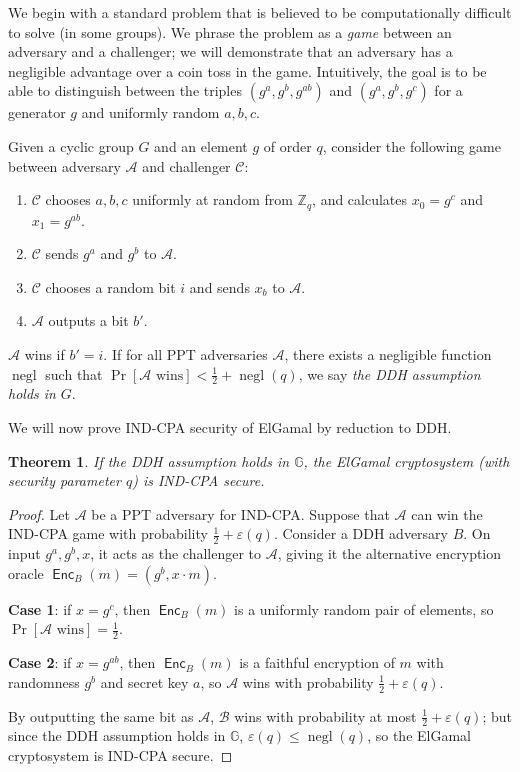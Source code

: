 \documentclass[11pt,twoside,a4paper]{article}
\DeclareMathOperator{\negl}{\text{negl}}
\DeclareMathOperator{\Enc}{\mathsf{Enc}}
\newtheorem{theorem}{Theorem}[section]
\theoremstyle{definition}
\begin{document}
We begin with a standard problem that is believed to be computationally difficult to solve (in some groups). We phrase the problem as a \textit{game} between an adversary and a challenger; we will demonstrate that an adversary has a negligible advantage over a coin toss in the game. Intuitively, the goal is to be able to distinguish between the triples $(g^a, g^b, g^{ab})$ and $(g^a, g^b, g^c)$ for  a generator $g$ and uniformly random $a, b, c$.

\begin{definition}
    Given a cyclic group $G$ and an element $g$ of order $q$, consider the following game between adversary $\mathcal{A}$ and challenger $\mathcal{C}$:
    \begin{enumerate}
        \item $\mathcal{C}$ chooses $a, b, c$ uniformly at random from $\mathbb{Z}_q$, and calculates $x_0=g^c$ and $x_1=g^{ab}$.
        \item $\mathcal{C}$ sends $g^a$ and $g^b$ to $\mathcal{A}$.
        \item $\mathcal{C}$ chooses a random bit $i$ and sends $x_b$ to $\mathcal{A}$.
        \item $\mathcal{A}$ outputs a bit $b'$.
    \end{enumerate}
    $\mathcal{A}$ wins if $b' = i$. If for all PPT adversaries $\mathcal{A}$, there exists a negligible function $\negl$ such that $\Pr[\mathcal{A}\text{ wins}]<\frac{1}{2}+\negl(q)$, we say \textit{the DDH assumption holds in} $G$.
\end{definition}
We will now prove IND-CPA security of ElGamal by reduction to DDH.
\begin{theorem}
    If the DDH assumption holds in $\mathbb{G}$, the ElGamal cryptosystem (with security parameter $q$) is IND-CPA secure.
\end{theorem}
\begin{proof}
    Let $\mathcal{A}$ be a PPT adversary for IND-CPA. Suppose that $\mathcal{A}$ can win the IND-CPA game with probability $\frac{1}{2}+\varepsilon(q)$. Consider a DDH adversary $B$. On input $g^a, g^b, x$, it acts as the challenger to $\mathcal{A}$, giving it the alternative encryption oracle $\Enc_B(m)=(g^b, x\cdot m)$.
    
    \textbf{Case 1}: if $x=g^c$, then $\Enc_B(m)$ is a uniformly random pair of elements, so $\Pr[\mathcal{A}\text{ wins}]=\frac{1}{2}$.
    
    \textbf{Case 2}: if $x=g^{ab}$, then $\Enc_B(m)$ is a faithful encryption of $m$ with randomness $g^b$ and secret key $a$, so $\mathcal{A}$ wins with probability $\frac{1}{2}+\varepsilon(q)$.

    By outputting the same bit as $\mathcal{A}$, $\mathcal{B}$ wins with probability at most $\frac{1}{2}+\varepsilon(q)$; but since the DDH assumption holds in $\mathbb{G}$, $\varepsilon(q)\leq\negl(q)$, so the ElGamal cryptosystem is IND-CPA secure.
\end{proof}
\end{document}
